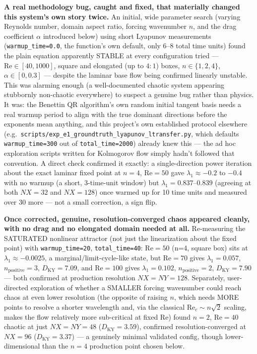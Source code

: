 \documentclass[11pt]{article}
\begin{document}
\textbf{A real methodology bug, caught and fixed, that materially changed
this system's own story twice.} An initial, wide parameter search (varying
Reynolds number, domain aspect ratio, forcing wavenumber $n$, and the
drag coefficient $\alpha$ introduced below) using short Lyapunov
measurements (\texttt{warmup\_time=0.0}, the function's own default, only
6--8 total time units) found the plain equation apparently STABLE at
every configuration tried --- $\mathrm{Re}\in[40,1000]$, square and
elongated (up to $4{:}1$) boxes, $n\in\{1,2,4\}$, $\alpha\in[0,0.3]$ ---
despite the laminar base flow being confirmed linearly unstable. This
was alarming enough (a well-documented chaotic system appearing
stubbornly non-chaotic everywhere) to suspect a genuine bug rather than
physics. It was: the Benettin QR algorithm's own random initial tangent
basis needs a real warmup period to align with the true dominant
directions before the exponents mean anything, and this project's own
established protocol elsewhere (e.g.\
\texttt{scripts/exp\_e1\_groundtruth\_lyapunov\_ltransfer.py}, which
defaults \texttt{warmup\_time=300} out of \texttt{total\_time=2000}) already
knew this --- the ad hoc exploration scripts written for Kolmogorov flow
simply hadn't followed that convention. A direct check confirmed it
exactly: a single-direction power iteration about the exact laminar fixed
point at $n=4$, $\mathrm{Re}=50$ gave $\lambda_1\approx-0.2$ to $-0.4$
with no warmup (a short, 3-time-unit window) but $\lambda_1=0.837$--$0.839$
(agreeing at both $NX=32$ and $NX=128$) once warmed up for 10 time units
and measured over 30 more --- not a small correction, a sign flip.

\textbf{Once corrected, genuine, resolution-converged chaos appeared
cleanly, with no drag and no elongated domain needed at all.}
Re-measuring the SATURATED nonlinear attractor (not just the linearization
about the fixed point) with \texttt{warmup\_time=20}, \texttt{total\_time=40}:
$\mathrm{Re}=50$ (n=4, square box) sits at $\lambda_1\approx-0.0025$, a
marginal/limit-cycle-like state, but $\mathrm{Re}=70$ gives
$\lambda_1=0.057$, $n_{\mathrm{positive}}=3$, $D_{\mathrm{KY}}=7.09$, and
$\mathrm{Re}=100$ gives $\lambda_1=0.102$, $n_{\mathrm{positive}}=2$,
$D_{\mathrm{KY}}=7.90$ --- both confirmed at production resolution
$NX{=}NY{=}128$. Separately, user-directed exploration of whether a
SMALLER forcing wavenumber could reach chaos at even lower resolution
(the opposite of raising $n$, which needs MORE points to resolve a
shorter wavelength and, via the classical $\mathrm{Re}_c\sim n\sqrt2$
scaling, makes the flow relatively more sub-critical at fixed
$\mathrm{Re}$) found $n=2$, $\mathrm{Re}=40$ chaotic at just $NX{=}NY{=}48$
($D_{\mathrm{KY}}=3.59$), confirmed resolution-converged at $NX{=}96$
($D_{\mathrm{KY}}=3.37$) --- a genuinely minimal validated config, though
lower-dimensional than the $n=4$ production point chosen below.
\end{document}
